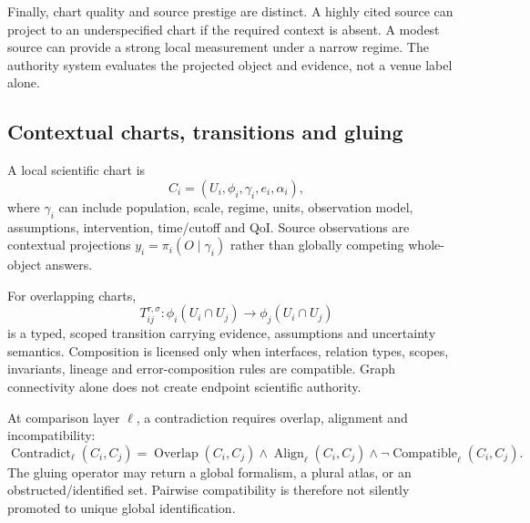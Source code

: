 Finally, chart quality and source prestige are distinct. A highly cited source can project to an underspecified chart if the required context is absent. A modest source can provide a strong local measurement under a narrow regime. The authority system evaluates the projected object and evidence, not a venue label alone.

\subsection{Contextual charts, transitions and gluing}
A local scientific chart is
\begin{equation}C_i=(U_i,\phi_i,\gamma_i,e_i,\alpha_i),\end{equation}
where $\gamma_i$ can include population, scale, regime, units, observation model, assumptions, intervention, time/cutoff and QoI. Source observations are contextual projections $y_i=\pi_i(O\mid\gamma_i)$ rather than globally competing whole-object answers.

For overlapping charts,
\begin{equation}T_{ij}^{\tau,\sigma}:\phi_i(U_i\cap U_j)\rightarrow\phi_j(U_i\cap U_j)\end{equation}
is a typed, scoped transition carrying evidence, assumptions and uncertainty semantics. Composition is licensed only when interfaces, relation types, scopes, invariants, lineage and error-composition rules are compatible. Graph connectivity alone does not create endpoint scientific authority.

At comparison layer $\ell$, a contradiction requires overlap, alignment and incompatibility:
\begin{equation}\operatorname{Contradict}_{\ell}(C_i,C_j)=\operatorname{Overlap}(C_i,C_j)\land\operatorname{Align}_{\ell}(C_i,C_j)\land\neg\operatorname{Compatible}_{\ell}(C_i,C_j).\end{equation}
The gluing operator may return a global formalism, a plural atlas, or an obstructed/identified set. Pairwise compatibility is therefore not silently promoted to unique global identification.

